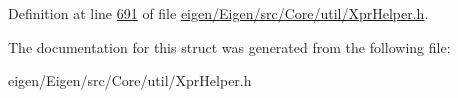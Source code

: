 Definition at line \hyperlink{eigen_2_eigen_2src_2_core_2util_2_xpr_helper_8h_source_l00691}{691} of file \hyperlink{eigen_2_eigen_2src_2_core_2util_2_xpr_helper_8h_source}{eigen/\+Eigen/src/\+Core/util/\+Xpr\+Helper.\+h}.



The documentation for this struct was generated from the following file\+:\begin{DoxyCompactItemize}
\item 
eigen/\+Eigen/src/\+Core/util/\+Xpr\+Helper.\+h\end{DoxyCompactItemize}
